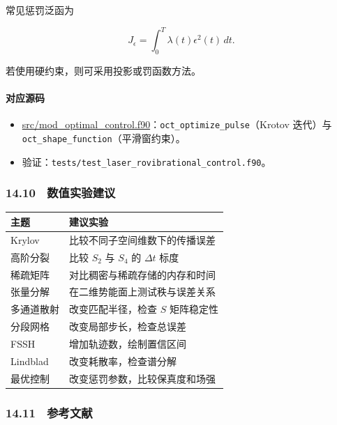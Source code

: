 \documentclass[
]{ctexbook}
\providecommand{\tightlist}{%
  \setlength{\itemsep}{0pt}\setlength{\parskip}{0pt}}
\begin{document}
常见惩罚泛函为

\[
J_\epsilon
=
\int_0^T
\lambda(t)\epsilon^2(t)\,dt.
\]

若使用硬约束，则可采用投影或罚函数方法。

\hypertarget{ux5bf9ux5e94ux6e90ux7801-65}{%
\paragraph{对应源码}\label{ux5bf9ux5e94ux6e90ux7801-65}}

\begin{itemize}
\tightlist
\item
  \href{https://github.com/l1Ha/QuantumGeneralModule/blob/main/src/mod_optimal_control.f90}{src/mod\_optimal\_control.f90}：\texttt{oct\_optimize\_pulse}（Krotov
  迭代）与 \texttt{oct\_shape\_function}（平滑窗约束）。
\item
  验证：\texttt{tests/test\_laser\_rovibrational\_control.f90}。
\end{itemize}

\hypertarget{ux6570ux503cux5b9eux9a8cux5efaux8bae}{%
\subsubsection{14.10　数值实验建议}\label{ux6570ux503cux5b9eux9a8cux5efaux8bae}}

\begin{longtable}[]{@{}ll@{}}
\toprule
主题 & 建议实验\tabularnewline
\midrule
\endhead
Krylov & 比较不同子空间维数下的传播误差\tabularnewline
高阶分裂 & 比较 \(S_2\) 与 \(S_4\) 的 \(\Delta t\) 标度\tabularnewline
稀疏矩阵 & 对比稠密与稀疏存储的内存和时间\tabularnewline
张量分解 & 在二维势能面上测试秩与误差关系\tabularnewline
多通道散射 & 改变匹配半径，检查 \(S\) 矩阵稳定性\tabularnewline
分段网格 & 改变局部步长，检查总误差\tabularnewline
FSSH & 增加轨迹数，绘制置信区间\tabularnewline
Lindblad & 改变耗散率，检查谱分解\tabularnewline
最优控制 & 改变惩罚参数，比较保真度和场强\tabularnewline
\bottomrule
\end{longtable}

\hypertarget{ux53c2ux8003ux6587ux732e-5}{%
\subsubsection{14.11　参考文献}\label{ux53c2ux8003ux6587ux732e-5}}
\end{document}
